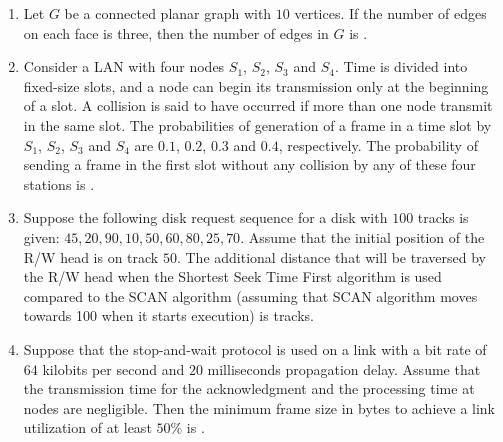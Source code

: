 \documentclass[journal,12pt,onecolumn]{IEEEtran}
\theoremstyle{remark}
\begin{document}
\begin{enumerate}[resume]
		\hfill{}
		
		\begin{enumerate}
		\end{enumerate}
		
		\item Let $G$ be a connected planar graph with $10$ vertices. If the number of edges on each face is three, then the number of edges in $G$ is \underline{\hspace{2cm}}.
		
		\hfill{}
		
		\item Consider a LAN with four nodes $S_1$, $S_2$, $S_3$ and $S_4$. Time is divided into fixed-size slots, and a node can begin its transmission only at the beginning of a slot. A collision is said to have occurred if more than one node transmit in the same slot. The probabilities of generation of a frame in a time slot by $S_1$, $S_2$, $S_3$ and $S_4$ are $0.1$, $0.2$, $0.3$ and $0.4$, respectively. The probability of sending a frame in the first slot without any collision by any of these four stations is \underline{\hspace{2cm}}.
		
		\hfill{}
		
		\item Suppose the following disk request sequence  for a disk with $100$ tracks is given: $45, 20, 90, 10, 50, 60, 80, 25, 70$. Assume that the initial position of the R/W head is on track $50$. The additional distance that will be traversed by the R/W head when the Shortest Seek Time First  algorithm is used compared to the SCAN  algorithm (assuming that SCAN algorithm moves towards 100 when it starts execution) is \underline{\hspace{2cm}} tracks.
		
		\hfill{}
		
		\item Suppose that the stop-and-wait protocol is used on a link with a bit rate of $64$ kilobits per second and $20$ milliseconds propagation delay. Assume that the transmission time for the acknowledgment and the processing time at nodes are negligible. Then the minimum frame size in bytes to achieve a link utilization of at least $50\%$ is \underline{\hspace{2cm}}.
		

\end{enumerate}
\end{document}
